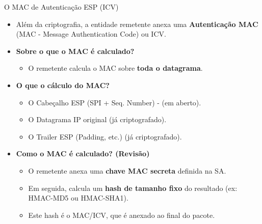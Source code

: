\begin{frame}{O MAC de Autenticação ESP (ICV)}
    \begin{itemize}
        \item Além da criptografia, a entidade remetente anexa uma \textbf{Autenticação MAC} (MAC - Message Authentication Code) ou ICV.

        \item \textbf{Sobre o que o MAC é calculado?}
              \begin{itemize}
                  \item O remetente calcula o MAC sobre \textbf{toda o datagrama}.
              \end{itemize}

        \item \textbf{O que  o cálculo do MAC?}
              \begin{itemize}
                  \item O Cabeçalho ESP (SPI + Seq. Number) - (em aberto).
                  \item O Datagrama IP original (já criptografado).
                  \item O Trailer ESP (Padding, etc.) (já criptografado).
              \end{itemize}

        \item \textbf{Como o MAC é calculado? (Revisão)}
              \begin{itemize}
                  \item O remetente anexa uma \textbf{chave MAC secreta} definida na SA.
                  \item Em seguida, calcula um \textbf{hash de tamanho fixo} do resultado (ex: HMAC-MD5 ou HMAC-SHA1).
                  \item Este hash é o MAC/ICV, que é anexado ao final do pacote.
              \end{itemize}
    \end{itemize}
\end{frame}

